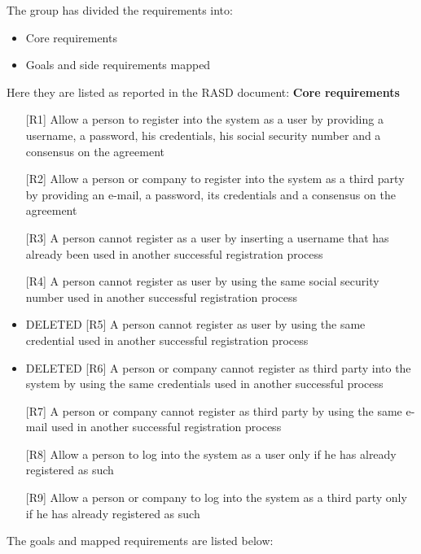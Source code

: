 
The group has divided the requirements into:
\begin{itemize}
    \item Core requirements
    \item Goals and side requirements mapped
\end{itemize}

\noindent Here they are listed as reported in the RASD document:
\newline
\newline
\textbf{Core requirements}
\begin{itemize}
\item [{[R1]}] Allow a person to register into the system as a user by providing a username, a password, his credentials, his social security number and a consensus on the agreement

\item[{[R2]}] Allow a person or company to register into the system as a third party by providing an e-mail, a password, its credentials and a consensus on the agreement
\item[{[R3]}] A person cannot register as a user by inserting a username that has already been used in another successful registration process
\item[{[R4]}] A person cannot register as user by using the same social security number used in another successful registration process 

\item DELETED {[R5] A person cannot register as user by using the same credential used in another successful registration process}
\item DELETED {[R6] A person or company cannot register as third party into the system by using the same credentials used in another successful process}

\item[{[R7]}] A person or company cannot register as third party by using the same e-mail used in another successful registration process

\item[{[R8]}] Allow a person to log into the system as a user only if he has already registered as such
\item[{[R9]}] Allow a person or company to log into the system as a third party only if he has already registered as such
\end{itemize}

\noindent The goals and mapped requirements are listed below:

